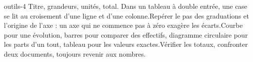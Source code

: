 \begin{blocEdition}{outils-4}
Titre, grandeurs, unités, total. Dans un tableau à double entrée, une case se lit au croisement d’une ligne et d’une colonne.Repérer le pas des graduations et l’origine de l’axe : un axe qui ne commence pas à zéro exagère les écarts.Courbe pour une évolution, barres pour comparer des effectifs, diagramme circulaire pour les parts d’un tout, tableau pour les valeurs exactes.Vérifier les totaux, confronter deux documents, toujours revenir aux nombres.
\end{blocEdition}
